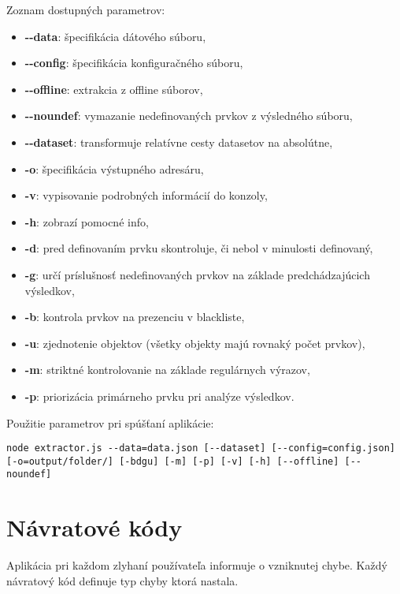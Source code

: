 Zoznam dostupných parametrov:

\begin{itemize}
    \item \textbf{-{}-data}: špecifikácia dátového súboru,
    \item \textbf{-{}-config}: špecifikácia konfiguračného súboru,
    \item \textbf{-{}-offline}: extrakcia z offline súborov,
    \item \textbf{-{}-noundef}: vymazanie nedefinovaných prvkov z výsledného súboru,
    \item \textbf{-{}-dataset}: transformuje relatívne cesty datasetov na absolútne,
    \item \textbf{-o}: špecifikácia výstupného adresáru,
    \item \textbf{-v}: vypisovanie podrobných informácií do konzoly,
    \item \textbf{-h}: zobrazí pomocné info,
    \item \textbf{-d}: pred definovaním prvku skontroluje, či nebol v minulosti definovaný,
    \item \textbf{-g}: určí príslušnosť nedefinovaných prvkov na základe predchádzajúcich výsledkov,
    \item \textbf{-b}: kontrola prvkov na prezenciu v blackliste,
    \item \textbf{-u}: zjednotenie objektov (všetky objekty majú rovnaký počet prvkov),
    \item \textbf{-m}: striktné kontrolovanie na základe regulárnych výrazov,
    \item \textbf{-p}: priorizácia primárneho prvku pri analýze výsledkov.
\end{itemize}

Použitie parametrov pri spúšťaní aplikácie:

\bigskip
\texttt{node extractor.js -{}-data=data.json  [-{}-dataset] [-{}-config=config.json]}\\
\texttt{[-o=output/folder/] [-bdgu] [-m] [-p] [-v] [-h] [-{}-offline] [-{}-noundef] }

\newpage

\section{Návratové kódy}

Aplikácia pri každom zlyhaní používateľa informuje o vzniknutej chybe. Každý návratový kód definuje typ chyby ktorá nastala.

